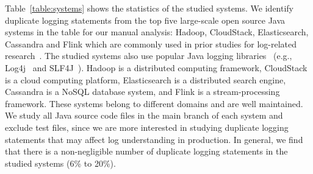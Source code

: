 Table~\ref{table:systems} shows the statistics of the studied systems. We identify duplicate logging statements from the top five large-scale open source Java systems in the table for our manual analysis: Hadoop, CloudStack, Elasticsearch, Cassandra and Flink which are commonly used in prior studies for log-related research~\cite{Li2018, log_pattern_ICSE2017, DLFinderSRC,mehran_emse_2018,nemo_log_issue}. The studied systems also use popular Java logging libraries~\cite{nemo_logging_utility} (e.g., Log4j~\cite{log4j} and SLF4J~\cite{SLF4J}). Hadoop is a distributed computing framework, CloudStack is a cloud computing platform, Elasticsearch is a distributed search engine, Cassandra is a NoSQL database system, and Flink is a stream-processing framework. These systems belong to different domains and are well maintained. We study all Java source code files in the main branch of each system and exclude test files, since we are more interested in studying duplicate logging statements that may affect log understanding in production. In general, we find that there is a non-negligible number of duplicate logging statements in the studied systems (6\% to 20\%). 

